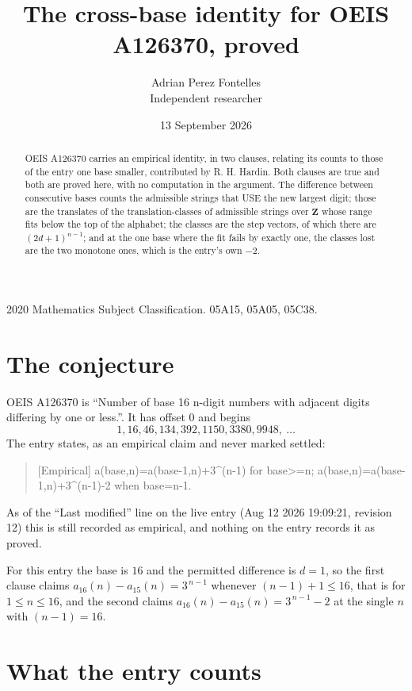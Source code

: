 \documentclass[11pt,a4paper]{article}
\title{The cross-base identity for OEIS A126370, proved}
\author{Adrian Perez Fontelles\\ \small Independent researcher}
\date{13 September 2026}
\theoremstyle{plain}
\theoremstyle{definition}
\begin{document}
\maketitle

\begin{abstract}
OEIS A126370 carries an empirical identity, in two clauses, relating its counts to those of the
entry one base smaller, contributed by R. H. Hardin. Both clauses are true and both are proved
here, with no computation in the argument. The difference between consecutive bases counts the
admissible strings that USE the new largest digit; those are the translates of the
translation-classes of admissible strings over $\mathbf{Z}$ whose range fits below the top of
the alphabet; the classes are the step vectors, of which there are $(2d+1)^{n-1}$; and at the
one base where the fit fails by exactly one, the classes lost are the two monotone ones, which
is the entry's own $-2$.
\end{abstract}

\noindent\small 2020 Mathematics Subject Classification. 05A15, 05A05, 05C38.\normalsize

\section{The conjecture}

OEIS A126370 is ``Number of base 16 n-digit numbers with adjacent digits differing by one or less.''. It has offset $0$ and begins
\[
1, 16, 46, 134, 392, 1150, 3380, 9948,\ \dots
\]
The entry states, as an empirical claim and never marked settled:
\begin{quote}
[Empirical] a(base,n)=a(base-1,n)+3\textasciicircum{}(n-1) for base>=n; a(base,n)=a(base-1,n)+3\textasciicircum{}(n-1)-2 when base=n-1.
\end{quote}
As of the ``Last modified'' line on the live entry (Aug 12 2026 19:09:21, revision 12)
this is still recorded as empirical, and nothing on the entry records it as proved.

For this entry the base is $16$ and the permitted difference is $d=1$, so the first clause
claims $a_{16}(n)-a_{15}(n)=3^{\,n-1}$ whenever $(n-1)+1\le16$, that is for
$1\le n\le16$, and the second claims $a_{16}(n)-a_{15}(n)=3^{\,n-1}-2$ at the single
$n$ with $(n-1)=16$.

\section{What the entry counts}
\end{document}
